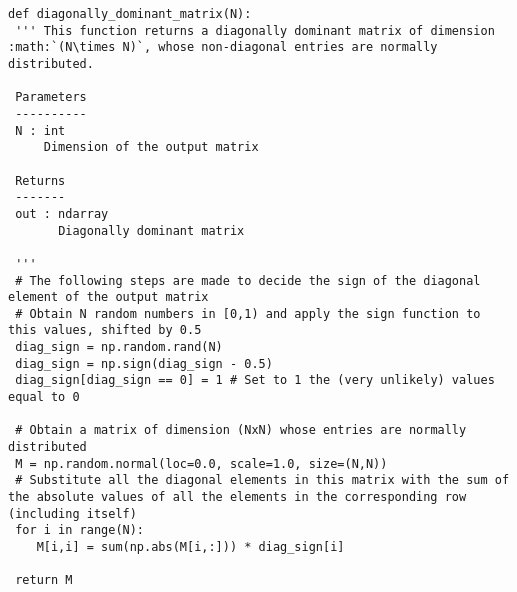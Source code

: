 \documentclass[a4paper,11pt]{report}
\begin{document}
\begin{verbatim}
def diagonally_dominant_matrix(N):
 ''' This function returns a diagonally dominant matrix of dimension :math:`(N\times N)`, whose non-diagonal entries are normally distributed.

 Parameters
 ----------
 N : int
     Dimension of the output matrix

 Returns
 -------
 out : ndarray
       Diagonally dominant matrix

 '''
 # The following steps are made to decide the sign of the diagonal element of the output matrix
 # Obtain N random numbers in [0,1) and apply the sign function to this values, shifted by 0.5
 diag_sign = np.random.rand(N)
 diag_sign = np.sign(diag_sign - 0.5)
 diag_sign[diag_sign == 0] = 1 # Set to 1 the (very unlikely) values equal to 0

 # Obtain a matrix of dimension (NxN) whose entries are normally distributed
 M = np.random.normal(loc=0.0, scale=1.0, size=(N,N))
 # Substitute all the diagonal elements in this matrix with the sum of the absolute values of all the elements in the corresponding row (including itself)
 for i in range(N):
    M[i,i] = sum(np.abs(M[i,:])) * diag_sign[i]

 return M
\end{verbatim}
\end{document}
